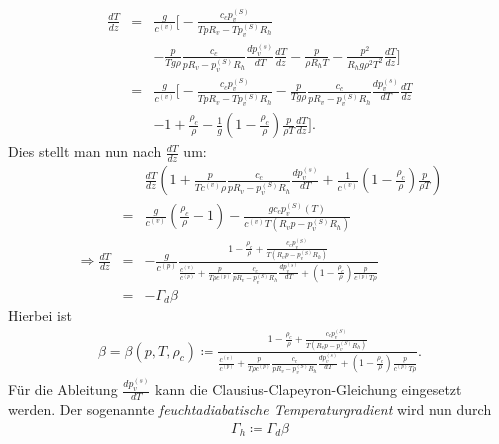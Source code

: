 \documentclass{book}
\begin{document}
%
\begin{eqnarray}
\frac{dT}{dz} & = & \frac{g}{c^{(v)}}\Bigg[ - \frac{c_cp_v^{(S)}}{TpR_v - Tp_v^{(S)}R_h}\nonumber\\
&&- \frac{p}{Tg\rho}\frac{c_c}{pR_v - p_v^{(S)}R_h}\frac{dp_v^{(s)}}{dT}\frac{dT}{dz} - \frac{p}{\rho R_hT} - \frac{p^2}{R_hg\rho^2T^2}\frac{dT}{dz}\Bigg]\nonumber\\
& = & \frac{g}{c^{(v)}}\Bigg[ - \frac{c_cp_v^{(S)}}{TpR_v - Tp_v^{(S)}R_h} - \frac{p}{Tg\rho}\frac{c_c}{pR_v - p_v^{(S)}R_h}\frac{dp_v^{(s)}}{dT}\frac{dT}{dz}\nonumber\\
&&- 1 + \frac{\rho
_c}{\rho} - \frac{1}{g}\left(1 - \frac{\rho_c}{\rho}\right)\frac{p}{\rho T}\frac{dT}{dz}\Bigg].
\end{eqnarray}
%
Dies stellt man nun nach $\frac{dT}{dz}$ um:
%
\begin{eqnarray}
&&\frac{dT}{dz}\left(1 + \frac{p}{Tc^{(v)}\rho}\frac{c_c}{pR_v - p_v^{(S)}R_h}\frac{dp_v^{(s)}}{dT} + \frac{1}{c^{(v)}}\left(1 - \frac{\rho_c}{\rho}\right)\frac{p}{\rho T}\right)\nonumber\\
& = & \frac{g}{c^{(v)}}\left(\frac{\rho_c}{\rho} - 1\right) - \frac{gc_cp_v^{(S)}\left(T\right)}{c^{(v)}T\left(R_vp - p_v^{(S)}R_h\right)}\nonumber\\
\Rightarrow\frac{dT}{dz} & = & -\frac{g}{c^{(p)}}\frac{1 - \frac{\rho_c}{\rho} + \frac{c_cp_v^{(S)}}{T\left(R_vp - p_v^{(S)}R_h\right)}}{\frac{c^{(v)}}{c^{(p)}} + \frac{p}{T\rho c^{(p)}}\frac{c_c}{pR_v - p_v^{(S)}R_h}\frac{dp_v^{(s)}}{dT} + \left(1 - \frac{\rho_c}{\rho}\right)\frac{p}{c^{(p)}T\rho}}\nonumber\\
& = & -\Gamma_d\beta
\end{eqnarray}
%
Hierbei ist
%
\begin{eqnarray}
\beta = \beta\left(p, T, \rho_c\right) \coloneqq\frac{1 - \frac{\rho_c}{\rho} + \frac{c_cp_v^{(S)}}{T\left(R_vp - p_v^{(S)}R_h\right)}}{\frac{c^{(v)}}{c^{(p)}} + \frac{p}{T\rho c^{(p)}}\frac{c_c}{pR_v - p_v^{(S)}R_h}\frac{dp_v^{(s)}}{dT} + \left(1 - \frac{\rho_c}{\rho}\right)\frac{p}{c^{(p)}T\rho}}.\label{eq:beta_malr}
\end{eqnarray}
%
Für die Ableitung $\frac{dp_v^{(s)}}{dT}$ kann die Clausius-Clapeyron-Gleichung eingesetzt werden. Der sogenannte \textit{feuchtadiabatische Temperaturgradient} wird nun durch
%
\begin{eqnarray}
\Gamma_h \coloneqq\Gamma_d\beta
\end{eqnarray}
\end{document}
